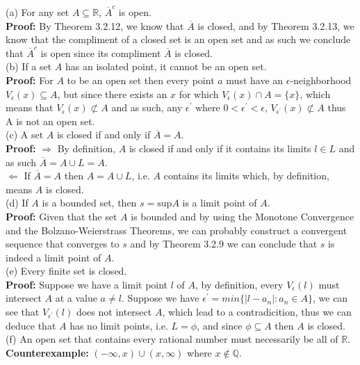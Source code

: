 \documentclass{article}
\begin{document}
\begin{itemize}
	(a) For any set $A \subseteq \mathbb{R}$, $\overline{A}^c$ is open. \\
	\textbf{Proof:} By Theorem 3.2.12, we know that $\overline{A}$ is closed, and by Theorem 3.2.13, we know that the compliment of a closed set is an open set and as such we conclude that $\overline{A}^c$ is open since its compliment $\overline{A}$ is closed. \\ 
	(b) If a set $A$ has an isolated point, it cannot be an open set. \\
	\textbf{Proof:} For $A$ to be an open set then every point $a$ must have an $\epsilon$-neighborhood $V_\epsilon(x) \subseteq A$, but since there exists an $x$ for which $V_\epsilon(x) \cap A = \{x\}$, which means that $V_\epsilon(x) \not\subset A$ and as such, any $\epsilon^{'} \text{ where } 0 < \epsilon^{'} < \epsilon \text{, } V_{\epsilon^{'}}(x) \not\subset A$ thus A is not an open set.  \\  
	(c) A set $A$ is closed if and only if $\overline{A} = A$. \\
	\textbf{Proof:} $\Rightarrow$ By definition, $A$ is closed if and only if it contains its limits $l \in L$ and as such $\overline{A} = A \cup L = A$. \\
	$\Leftarrow$ If $\overline{A} = A$ then $A = A \cup L$, i.e. $A$ contains its limits which, by definition, means $A$ is closed. \\ 
	(d) If $A$ is a bounded set, then $s = \text{sup}A$ is a limit point of $A$. \\
	\textbf{Proof:} Given that the set $A$ is bounded and by using the Monotone Convergence and the Bolzano-Weierstrass Theorems, we can probably construct a convergent sequence that converges to $s$ and by Theorem 3.2.9 we can conclude that $s$ is indeed a limit point of $A$.\\ 
	(e) Every finite set is closed. \\
	\textbf{Proof:} Suppose we have a limit point $l$ of $A$, by definition, every $V_\epsilon(l)$ must intersect $A$ at a value $a \neq l$. Suppose we have $\epsilon^{'} = min\{|l - a_n|: a_n \in A\}$, we can see that $V_{\epsilon^{'}}(l)$ does not intersect $A$, which lead to a contradicition, thus we can deduce that $A$ has no limit points, i.e. $L = \phi$, and since $\phi \subseteq A$ then $A$ is closed. \\
	(f) An open set that contains every rational number must necessarily be all of $\mathbb{R}$. \\
	\textbf{Counterexample:} $(-\infty, x) \cup (x, \infty)$ where $x \not\in \mathbb{Q}$. \\ 
\end{itemize}
\end{document}
